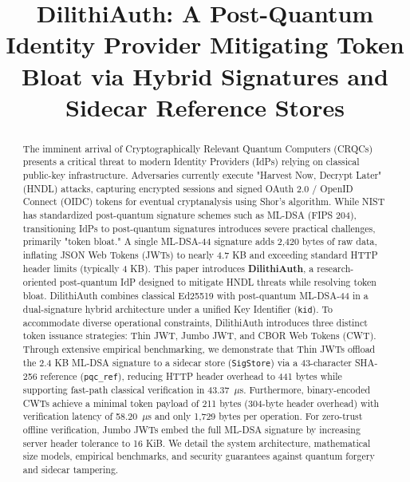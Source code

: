 \documentclass{article}
\begin{document}
\title{DilithiAuth: A Post-Quantum Identity Provider Mitigating Token Bloat via Hybrid Signatures and Sidecar Reference Stores}

\author{
}

\maketitle

\begin{abstract}
The imminent arrival of Cryptographically Relevant Quantum Computers (CRQCs) presents a critical threat to modern Identity Providers (IdPs) relying on classical public-key infrastructure. Adversaries currently execute "Harvest Now, Decrypt Later" (HNDL) attacks, capturing encrypted sessions and signed OAuth 2.0 / OpenID Connect (OIDC) tokens for eventual cryptanalysis using Shor's algorithm. While NIST has standardized post-quantum signature schemes such as ML-DSA (FIPS 204), transitioning IdPs to post-quantum signatures introduces severe practical challenges, primarily "token bloat." A single ML-DSA-44 signature adds 2,420 bytes of raw data, inflating JSON Web Tokens (JWTs) to nearly 4.7 KB and exceeding standard HTTP header limits (typically 4 KB). This paper introduces \textbf{DilithiAuth}, a research-oriented post-quantum IdP designed to mitigate HNDL threats while resolving token bloat. DilithiAuth combines classical Ed25519 with post-quantum ML-DSA-44 in a dual-signature hybrid architecture under a unified Key Identifier (\texttt{kid}). To accommodate diverse operational constraints, DilithiAuth introduces three distinct token issuance strategies: Thin JWT, Jumbo JWT, and CBOR Web Tokens (CWT). Through extensive empirical benchmarking, we demonstrate that Thin JWTs offload the 2.4 KB ML-DSA signature to a sidecar store (\texttt{SigStore}) via a 43-character SHA-256 reference (\texttt{pqc\_ref}), reducing HTTP header overhead to 441 bytes while supporting fast-path classical verification in 43.37~$\mu$s. Furthermore, binary-encoded CWTs achieve a minimal token payload of 211 bytes (304-byte header overhead) with verification latency of 58.20~$\mu$s and only 1,729 bytes per operation. For zero-trust offline verification, Jumbo JWTs embed the full ML-DSA signature by increasing server header tolerance to 16 KiB. We detail the system architecture, mathematical size models, empirical benchmarks, and security guarantees against quantum forgery and sidecar tampering.
\end{abstract}
\end{document}

